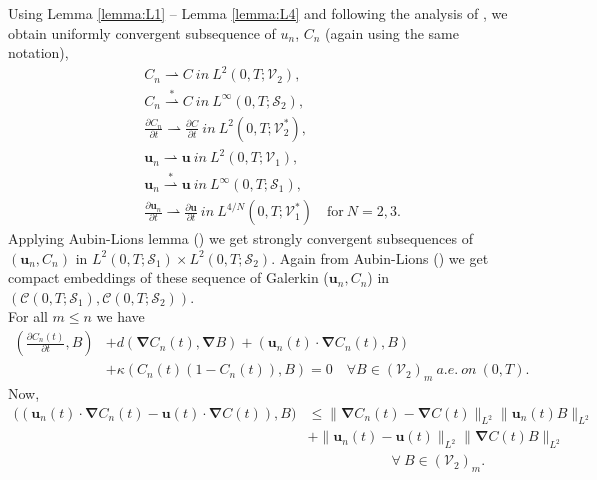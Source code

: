 \documentclass[final,3p,times]{elsarticle}
\theoremstyle{plain}
\theoremstyle{remark}
\theoremstyle{plain}
\theoremstyle{remark}
\begin{document}
Using Lemma \ref{lemma:L1} -- Lemma \ref{lemma:L4} and following the analysis of \citet{kundu2024existence, kostin2003modelling}, we obtain uniformly convergent subsequence of $u_n$, $C_n$ (again using the same notation),
	\begin{align*}
		&\quad C_n  \rightharpoonup C\  in\ L^2\left(0,T;\mathscr V_2\right),   \\ 
		&\quad C_n \stackrel{*}{\rightharpoonup} C \ in \ L^\infty\left(0,T; \mathscr S_2\right),  \\
		&\quad \frac{\partial C_n}{\partial t} \rightharpoonup \frac{\partial C}{\partial t} \ in \ L^2\left(0,T;\mathscr V_2^*\right),   \\ 
		&\quad \mathbf{u}_n \rightharpoonup \mathbf{u} \ in \ L^2\left(0,T;\mathscr V_1\right), \\	
		&\quad \mathbf{u}_n \stackrel{*}{\rightharpoonup} \mathbf{u} \ in \ L^\infty \left(0,T; \mathscr S_1\right),    \\	
		&\quad \frac{\partial \mathbf u_n}{\partial t} \rightharpoonup \frac{\partial \mathbf u}{\partial t} \ in \ L^{4/N}\left(0,T;\mathscr V_1^*\right)\quad\text{for}\ N = 2,3 . \end{align*}
	Applying Aubin-Lions lemma (\emph{\citep[Corollary 4]{simon1986compact}}) we get strongly convergent subsequences of $(\mathbf u_n,C_n)$ in $L^2\left(0,T; \mathscr S_1\right) \times L^2\left(0,T; \mathscr S_2\right)$. Again from Aubin-Lions (\emph{\citep[Corollary 4]{simon1986compact}}) we get compact embeddings of these sequence of Galerkin ($\mathbf{u}_n,C_n$) in $\left(\mathcal{C}\left(0,T; \mathscr S_1\right),\mathcal{C}\left(0,T; \mathscr S_2\right)\right)$.\\
	For all $m \le n$ we have
	\begin{align}
	\left(\frac{\partial C_n\left(t\right)}{\partial t},B\right)
    & + d\left(\boldsymbol{\nabla} C_n\left(t\right), \boldsymbol{\nabla} B\right) + \left(\mathbf{u}_n\left(t\right) \cdot \boldsymbol{\nabla} C_n\left(t\right),B\right) \nonumber \\ 
    & + \kappa \left(C_n\left(t\right)\left(1-C_n\left(t\right)\right),B\right) = 0 \quad \forall B \in \left(\mathscr V_2\right)_m \ a.e. \ on \ \left(0,T\right) \label{eq: C_n pass limit}.
	\end{align}
Now,
\begin{align}
\Big(\left(\mathbf{u}_n\left(t\right) \cdot \boldsymbol{\nabla} C_n\left(t\right)-\mathbf{u}\left(t\right) \cdot \boldsymbol{\nabla} C\left(t\right)\right), B\Big)
& \le \| \boldsymbol{\nabla} C_n\left(t\right) - \boldsymbol{\nabla} C\left(t\right)\|_{L^2}\|\mathbf{u}_n\left(t\right)B\|_{L^2} \nonumber \\ 
& +\| \mathbf{u}_n\left(t\right)-\mathbf{u}\left(t\right)\|_{L^2}\|\boldsymbol{\nabla} C\left(t\right)B\|_{L^2} \nonumber\\  
& \qquad\qquad\qquad \forall \ B \in \left(\mathscr V_2\right)_m .\label{eq: estimate of u.grad C}
\end{align}
\end{document}
